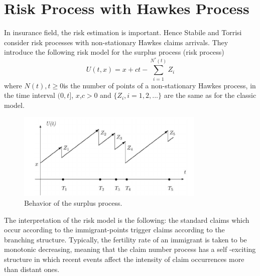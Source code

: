 \section{ Risk Process with Hawkes Process}
In insurance field, the risk estimation is important. Hence Stabile and Torrisi consider risk processes with non-stationary Hawkes claims arrivals. They introduce the following risk model for the surplus process (risk process)
$$ U(t,x) = x + ct - \displaystyle\sum_{i=1}^{N^{*}(t)}Z_{i}$$
where ${N(t), t \geq 0} $is the number of points of a non-stationary Hawkes process, in the time interval $(0, t]$, $x$,$ c > 0$ and $\{Z_{i}, i = 1, 2, . . .\}$ are the same as for the classic model.

 \begin{figure}[H]
 	\centering
 	\includegraphics[width=0.8\textwidth ]{SurplusProcess.PNG}
 	\caption{Behavior of the surplus process.}
 	\label{Surplus_Process}
 \end{figure}
 The interpretation of the risk model is the following: the
 standard claims which occur according to the immigrant-points trigger claims according
 to the branching structure. Typically, the fertility rate of an immigrant is taken to
 be monotonic decreasing, meaning that the claim number process has a self -exciting
 structure in which recent events affect the intensity of claim occurrences more than
 distant ones.
